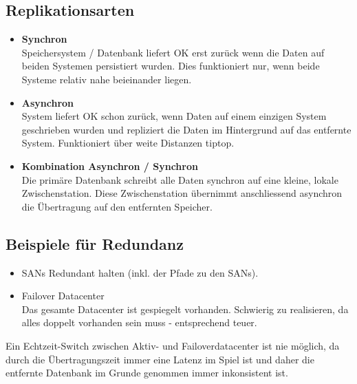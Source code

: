 \subsection{Replikationsarten}\label{sec:replikationsarten}
\begin{itemize}
	\item \textbf{Synchron} \\
		Speichersystem / Datenbank liefert OK erst zurück wenn die Daten auf beiden Systemen persistiert wurden. Dies funktioniert nur, wenn beide Systeme relativ nahe beieinander liegen.
	\item \textbf{Asynchron} \\
		System liefert OK schon zurück, wenn Daten auf einem einzigen System geschrieben wurden und repliziert die Daten im Hintergrund auf das entfernte System. Funktioniert über weite Distanzen tiptop.
	\item \textbf{Kombination Asynchron / Synchron} \\
		Die primäre Datenbank schreibt alle Daten synchron auf eine kleine, lokale Zwischenstation. Diese Zwischenstation übernimmt anschliessend asynchron die Übertragung auf den entfernten Speicher.
\end{itemize}

\subsection{Beispiele für Redundanz}\label{sec:bsp_redundanz}
\begin{itemize}
	\item SANs Redundant halten (inkl. der Pfade zu den SANs).
	\item Failover Datacenter \\ 
		Das gesamte Datacenter ist gespiegelt vorhanden. Schwierig zu realisieren, da alles doppelt vorhanden sein muss - entsprechend teuer.
\end{itemize}
Ein Echtzeit-Switch zwischen Aktiv- und Failoverdatacenter ist nie möglich, da durch die Übertragungszeit immer eine Latenz im Spiel ist und daher die entfernte Datenbank im Grunde genommen immer inkonsistent ist.